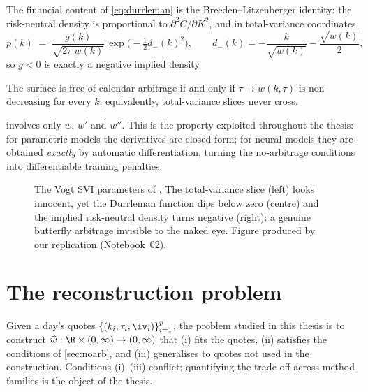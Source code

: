 The financial content of \cref{eq:durrleman} is the Breeden--Litzenberger identity: the risk-neutral density is proportional to $\partial^2 C/\partial K^2$, and in total-variance coordinates
\begin{equation}
  p(k) \;=\; \frac{g(k)}{\sqrt{2\pi\,w(k)}}\,\exp\!\Big(-\tfrac12 d_-(k)^2\Big),
  \qquad d_-(k) = -\frac{k}{\sqrt{w(k)}}-\frac{\sqrt{w(k)}}{2},
\end{equation}
so $g<0$ is exactly a negative implied density.

\begin{definition}
The surface is free of calendar arbitrage if and only if $\tau\mapsto w(k,\tau)$ is non-decreasing for every $k$; equivalently, total-variance slices never cross.
\end{definition}

 involves only $w$, $w'$ and $w''$. This is the property exploited throughout the thesis: for parametric models the derivatives are closed-form; for neural models they are obtained \emph{exactly} by automatic differentiation, turning the no-arbitrage conditions into differentiable training penalties.

\begin{figure}[t]
  \centering
  \caption[The Vogt smile: hidden butterfly arbitrage]{The Vogt SVI parameters of \cite[Ex.~3.1]{gatheral2014arbitrage}. The total-variance slice (left) looks innocent, yet the Durrleman function dips below zero (centre) and the implied risk-neutral density turns negative (right): a genuine butterfly arbitrage invisible to the naked eye. Figure produced by our replication (Notebook~02).}
  \label{fig:vogt}
\end{figure}

\section{The reconstruction problem}
Given a day's quotes $\{(k_i,\tau_i,{\iv}_i)\}_{i=1}^{p}$, the problem studied in this thesis is to construct $\widehat{w}:\R\times(0,\infty)\to(0,\infty)$ that (i) fits the quotes, (ii) satisfies the conditions of \cref{sec:noarb}, and (iii) generalises to quotes not used in the construction. Conditions (i)--(iii) conflict; quantifying the trade-off across method families is the object of the thesis.
